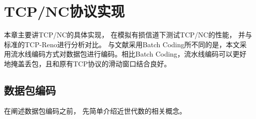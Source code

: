 \chapter{TCP/NC协议实现}
本章主要讲TCP/NC的具体实现，
在模拟有损信道下测试TCP/NC的性能，
并与标准的TCP-Reno进行分析对比。
与文献\cite{翟丰泰2015基于网络编码的,李永超2015基于网络编码}采用Batch Coding所不同的是，本文采用流水线编码方式对数据包进行编码。相比Batch Coding，流水线编码可以更好地掩盖丢包，且和原有TCP协议的滑动窗口结合良好。
\section{数据包编码}
在阐述数据包编码之前，
先简单介绍近世代数的相关概念。
